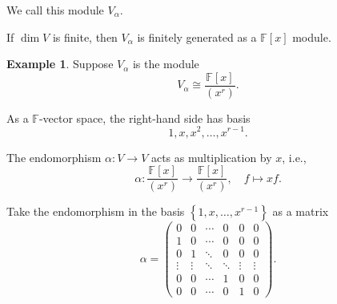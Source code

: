 \documentclass{article}
\theoremstyle{definition}
\newtheorem{example}[theorem]{Example}
\theoremstyle{remark}
\newcommand{\pqty}[1]{\left(#1\right)}
\newcommand{\bqty}[1]{\left[#1\right]}
\newcommand{\Bqty}[1]{\left\{#1\right\}}
\newcommand{\flatfrac}[2]{\frac{#1}{#2}}
\newcommand{\functiondomain}[3]{#1:#2\to #3}
\newcommand{\function}[5]{#1:#2\to #3,\quad #4\mapsto #5}
\newcommand{\pmqty}[1]{\begin{pmatrix}#1\end{pmatrix}}
\newcommand{\isomorphic}{\cong}
\newcommand{\FF}{\mathbb{F}}
\begin{document}
We call this module \(V_{\alpha}\).

If \(\dim V\) is finite, then \(V_{\alpha}\) is finitely generated as a \(\FF\bqty{x}\) module.

\begin{example}
    \label{ex:lower-diagonal-1}%
    Suppose \(V_{\alpha}\) is the module
    \[
        V_{\alpha} \isomorphic \flatfrac{\FF\bqty{x}}{\pqty{x^r}}.
    \]

    As a \(\FF\)-vector space, the right-hand side has basis
    \[
        1, x, x^2, \ldots, x^{r - 1}.
    \]  

    The endomorphism \(\functiondomain{\alpha}{V}{V}\) acts as multiplication by \(x\), i.e.,
    \[
        \function{\alpha}{\flatfrac{\FF\bqty{x}}{\pqty{x^r}}}{\flatfrac{\FF\bqty{x}}{\pqty{x^r}}}{f}{xf.}
    \]

    Take the endomorphism in the basis \(\Bqty{1, x, \ldots, x^{r - 1}}\) as a matrix
    \[
        \alpha = \pmqty{
            0 & 0 & \cdots & 0 & 0 & 0 \\
            1 & 0 & \cdots & 0 & 0 & 0 \\
            0 & 1 & \ddots & 0 & 0 & 0 \\
            \vdots & \vdots & \ddots & \ddots & \vdots & \vdots \\
            0 & 0 & \cdots & 1 & 0 & 0 \\
            0 & 0 & \cdots & 0 & 1 & 0
        }.
    \]
\end{example}
\end{document}
